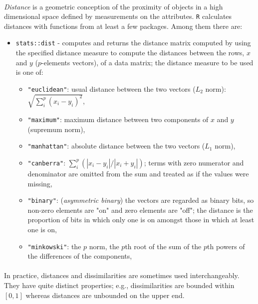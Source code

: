 \documentclass[10pt]{article}\usepackage[]{graphicx}\usepackage[]{color}
\begin{document}
\paragraph{}
\textit{Distance} is a geometric conception of the proximity of objects in 
a high dimensional space defined by measurements on the attributes. \texttt{R} 
calculates distances with functions from at least a few packages. Among them 
there are: 
\begin{itemize}
\item \texttt{stats::dist} - computes and returns the distance matrix computed 
by using the specified distance measure to compute the distances between the 
rows, $x$ and $y$ ($p$-elements vectors), of a data matrix; the distance measure 
to be used is one of: 
  \begin{itemize}
  \item \texttt{"euclidean"}:
  \newline usual distance between the two vectors ($L_2$ norm): 
  $\sqrt{\sum_{i}^{p}(x_i - y_i)^2}$,
  \item \texttt{"maximum"}:
  \newline maximum distance between two components of $x$ and 
  $y$ (supremum norm),
  \item \texttt{"manhattan"}:
  \newline absolute distance between the two vectors 
  ($L_1$ norm),
  \item \texttt{"canberra"}:
  \newline $\sum_{i}^{p}(|x_i - y_i| / |x_i + y_i|)$; 
  terms with zero numerator and denominator are omitted from the sum and treated 
  as if the values were missing,
  \item \texttt{"binary"}:
  \newline (\textit{asymmetric binary}) the vectors are regarded 
  as binary bits, so non-zero elements are "on" and zero elements are 
  "off"; the distance is the proportion of bits in which only one is on amongst 
  those in which at least one is on,
  \item \texttt{"minkowski"}:
  \newline the $p$ norm, the $p$th root of the sum of the 
  $p$th powers of the differences of the components,
  \end{itemize}
  
\end{itemize}

\paragraph{}
In practice, distances and dissimilarities are sometimes used interchangeably. 
They have quite distinct properties; e.g., dissimilarities are bounded within 
$[0,1]$ whereas distances are unbounded on the upper end.
\end{document}

